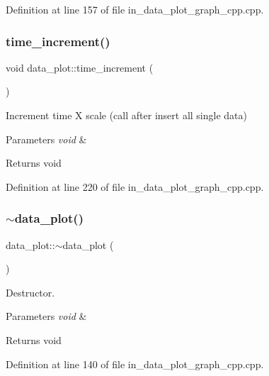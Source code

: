 Definition at line 157 of file in\+\_\+data\+\_\+plot\+\_\+graph\+\_\+cpp.\+cpp.

\mbox{\label{group___data__plot_ga05f67897c18233fe55234297fe686c37}} 
\subsubsection{time\_increment()}
{\footnotesize\ttfamily void data\+\_\+plot\+::time\+\_\+increment (\begin{DoxyParamCaption}\item[{void}]{ }\end{DoxyParamCaption})}



Increment time X scale (call after insert all single data) 


\begin{DoxyParams}{Parameters}
{\em void} & \\
\hline
\end{DoxyParams}
\begin{DoxyReturn}{Returns}
void 
\end{DoxyReturn}


Definition at line 220 of file in\+\_\+data\+\_\+plot\+\_\+graph\+\_\+cpp.\+cpp.

\mbox{\label{group___data__plot_gaa93b5d07fdbb25ea19a58b7f6d6624a8}} 
\subsubsection{$\sim$data\_plot()}
{\footnotesize\ttfamily data\+\_\+plot\+::$\sim$data\+\_\+plot (\begin{DoxyParamCaption}\item[{void}]{ }\end{DoxyParamCaption})}



Destructor. 


\begin{DoxyParams}{Parameters}
{\em void} & \\
\hline
\end{DoxyParams}
\begin{DoxyReturn}{Returns}
void 
\end{DoxyReturn}


Definition at line 140 of file in\+\_\+data\+\_\+plot\+\_\+graph\+\_\+cpp.\+cpp.



